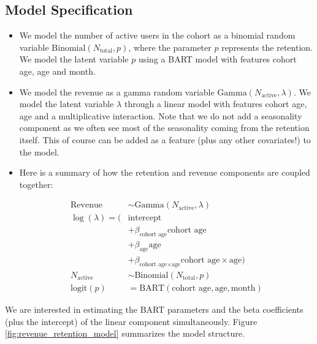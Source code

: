 \documentclass[11pt]{amsart}
\begin{document}
\subsection*{Model Specification}   
\begin{itemize}
    \item We model the number of active users in the cohort as a binomial random
        variable $\text{Binomial}(N_{\text{total}}, p)$, where the parameter $p$
        represents the retention. We model the latent variable $p$ using a BART model
        with features cohort age, age and month.
    
    \item We model the revenue as a gamma random variable
        $\text{Gamma}(N_{\text{active}}, \lambda)$. We model the latent variable
        $\lambda$ through a linear model with features cohort age, age and a
        multiplicative interaction. Note that we do not add a seasonality component as
        we often see most of the seasonality coming from the retention itself. This of
        course can be added as a feature (plus any other covariates!) to the model.
    
    \item Here is a summary of how the retention and revenue components are coupled
        together:
    
    \begin{align*}
        \text{Revenue} & \sim \text{Gamma}(N_{\text{active}}, \lambda) \\
        \log(\lambda) = (& \text{intercept} \\
            & + \beta_{\text{cohort age}} \text{cohort age} \\
            & + \beta_{\text{age}} \text{age} \\
            & + \beta_{\text{cohort age} \times \text{age}} \text{cohort age} \times \text{age}) \\
        N_{\text{active}} & \sim \text{Binomial}(N_{\text{total}}, p) \\
        \textrm{logit}(p) & = \text{BART}(\text{cohort age}, \text{age}, \text{month})
    \end{align*}
    
\end{itemize}

We are interested in estimating the BART parameters and the beta coefficients (plus the
intercept) of the linear component simultaneously. Figure
\ref{fig:revenue_retention_model} summarizes the model structure.
\end{document}
